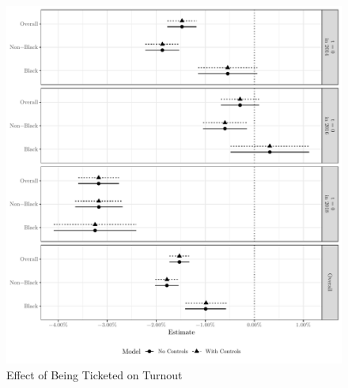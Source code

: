 \documentclass[
  12pt,
]{article}
\begin{document}
\begin{figure}[H]

{\centering \includegraphics{compile_files/figure-latex/coef-plot-primary-1} 

}

\caption{\label{fig:did-1}Effect of Being Ticketed on Turnout}\label{fig:coef-plot-primary}
\end{figure}
\end{document}
